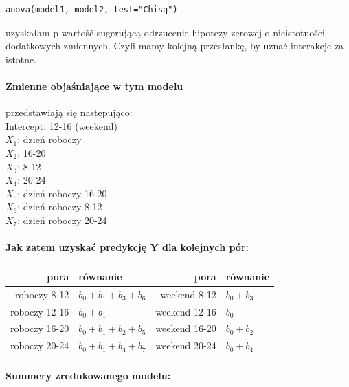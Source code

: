 \documentclass[a4paper,11pt]{article}
\begin{document}
\begin{verbatim}
anova(model1, model2, test="Chisq")
\end{verbatim}

uzyskałam p-wartość sugerującą odrzucenie hipotezy zerowej o nieistotności dodatkowych zmiennych. Czyli mamy kolejną przesłankę, by uznać interakcje za istotne.

\paragraph{Zmienne objaśniające w tym modelu} przedstawiają się następująco: \\
Intercept: 12-16 (weekend)\\
$X_{1}$: dzień roboczy \\
$X_{2}$: 16-20 \\
$X_{3}$: 8-12 \\
$X_{4}$: 20-24 \\
$X_{5}$: dzień roboczy 16-20 \\
$X_{6}$: dzień roboczy 8-12 \\
$X_{7}$: dzień roboczy 20-24 \\

\paragraph{Jak zatem uzyskać predykcję Y dla kolejnych pór:}

\begin{center}
\begin{tabular}{|r|l|r|l|} \hline
pora & równanie & pora & równanie\\ \hline
roboczy 8-12 & $b_{0} + b_{1} + b_{3} +  b_{6}$ & weekend 8-12 & $b_{0} + b_{3}$ \\
roboczy 12-16 & $b_{0} + b_{1}$ & weekend 12-16 & $b_{0}$ \\
roboczy 16-20 & $b_{0} + b_{1} + b_{2} +  b_{5}$ & weekend 16-20 & $b_{0} + b_{2}$ \\
roboczy 20-24 & $b_{0} + b_{1} + b_{4} +  b_{7}$ & weekend 20-24 & $b_{0} + b_{4}$ \\ \hline
\end{tabular}
\end{center}



\paragraph{Summery zredukowanego modelu:}
\end{document}
